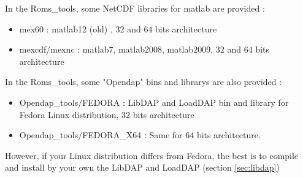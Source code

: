 In the Roms\_tools, some NetCDF libraries for matlab are provided : 
\begin{itemize}
\item mex60 : matlab12 (old) , $32$ and $64$ bits architecture
\item mexcdf/mexnc : matlab7, matlab2008, matlab2009, $32$ and $64$ bits architecture
\end{itemize}

In the Roms\_tools, some "Opendap" bins and librarys are also provided :
\begin{itemize}
\item Opendap\_tools$/$FEDORA : LibDAP and LoadDAP bin and library for Fedora Linux
  distribution, $32$ bits architecture
\item Opendap\_tools$/$FEDORA\_X64 : Same for $64$ bits architecture.
\end{itemize}
However, if your Linux distribution differs from Fedora, the best is to compile and
install by your own the LibDAP and LoadDAP (section \ref{sec:libdap}) \\


